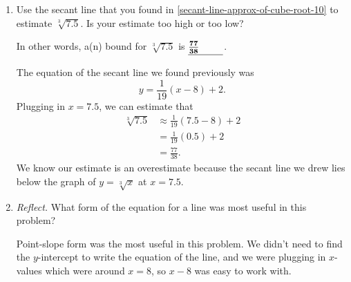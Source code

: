 \documentclass{article}
\begin{document}
\begin{enumerate}
\begin{enumerate}[resume]
    \begin{problem}
      Another way we can say this is that a(n)  bound for $\sqrt[3]{10}$ is 
      $\fitb{0.5in}{\frac{40}{19}}$.
    \end{problem}

    \begin{solution}
      We know our estimate is an underestimate because the secant line we drew
      lies below the graph of $y=\sqrt[3]{x}$ at $x=10$.
    \end{solution}

  \item
    \begin{problem}[\vfill]
      Use the secant line that you found in \ref{secant-line-approx-of-cube-root-10} to estimate $\sqrt[3]{7.5}$. Is your estimate too high or too low? 
    \end{problem}

    \begin{problem}      
      In other words, a(n)  bound for $\sqrt[3]{7.5}$ is $\fitb{0.5in}{\frac{77}{38}}$.
    \end{problem}

    \begin{solution}
      The equation of the secant line we found previously was
      \[y=\frac{1}{19}(x-8)+2.\]
      Plugging in $x=7.5$, we can estimate that
      \begin{align*}
        \sqrt[3]{7.5} & \approx \frac{1}{19}(7.5-8) + 2 \\[2pt]
        & = \frac{1}{19}(0.5) + 2 \\[2pt]
        &= \frac{77}{38}.
      \end{align*}
      We know our estimate is an overestimate because the secant line we drew
      lies below the graph of $y=\sqrt[3]{x}$ at $x=7.5$.
    \end{solution}

  \item 


    \begin{problem}[\nstretch{0.35}]
      \emph{Reflect.} What form of the equation for a line was most
      useful in this problem?
    \end{problem}

    \begin{solution}
        Point-slope form was the most useful in this problem. We didn't need to find the $y$-intercept to write
        the equation of the line, and we were plugging in $x$-values which
        were around $x=8$, so $x-8$ was easy to work with.
    \end{solution}


\end{enumerate}
\end{enumerate}
\end{document}
